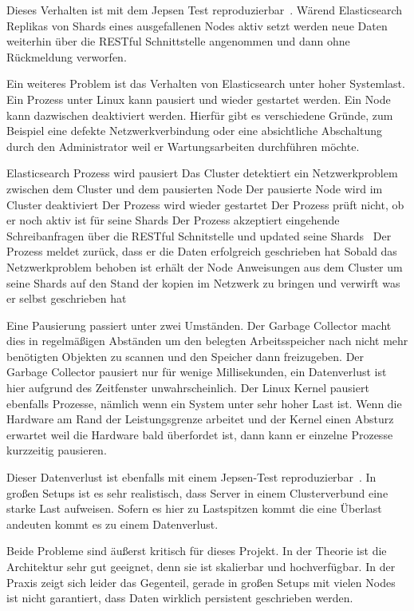 Dieses Verhalten ist mit dem Jepsen Test reproduzierbar~\cite{es_jepsen_iso}.
Wärend Elasticsearch Replikas von Shards eines ausgefallenen Nodes aktiv setzt
werden neue Daten weiterhin über die RESTful Schnittstelle angenommen und dann
ohne Rückmeldung verworfen.

Ein weiteres Problem ist das Verhalten von Elasticsearch unter hoher Systemlast.
Ein Prozess unter Linux kann pausiert und wieder gestartet werden. Ein Node
kann dazwischen deaktiviert werden. Hierfür gibt es verschiedene Gründe, zum
Beispiel eine defekte Netzwerkverbindung oder eine absichtliche Abschaltung
durch den Administrator weil er Wartungsarbeiten durchführen möchte.

\begin{outline}
  \1 Elasticsearch Prozess wird pausiert
  \1 Das Cluster detektiert ein Netzwerkproblem zwischen dem Cluster und dem
  pausierten Node
  \1 Der pausierte Node wird im Cluster deaktiviert
  \1 Der Prozess wird wieder gestartet
  \1 Der Prozess prüft nicht, ob er noch aktiv ist für seine Shards
  \1 Der Prozess akzeptiert eingehende Schreibanfragen über die RESTful
  Schnitstelle und updated seine Shards
  \ Der Prozess meldet zurück, dass er die Daten erfolgreich geschrieben hat
  \1 Sobald das Netzwerkproblem behoben ist erhält der Node Anweisungen aus dem
  Cluster um seine Shards auf den Stand der kopien im Netzwerk zu bringen und
  verwirft was er selbst geschrieben hat
\end{outline}

Eine Pausierung passiert unter zwei Umständen. Der \gls{Garbage Collector}
macht dies in regelmäßigen Abständen um den belegten Arbeitsspeicher nach nicht
mehr benötigten Objekten zu scannen und den Speicher dann freizugeben. Der
Garbage Collector pausiert nur für wenige Millisekunden, ein Datenverlust ist
hier aufgrund des Zeitfenster unwahrscheinlich. Der Linux Kernel pausiert
ebenfalls Prozesse, nämlich wenn ein System unter sehr hoher Last ist.  Wenn
die Hardware am Rand der Leistungsgrenze arbeitet und der Kernel einen Absturz
erwartet weil die Hardware bald überfordet ist, dann kann er einzelne Prozesse
kurzzeitig pausieren.

Dieser Datenverlust ist ebenfalls mit einem Jepsen-Test
reproduzierbar~\cite{es_jepsen_pause}. In großen Setups ist es sehr
realistisch, dass Server in einem Clusterverbund eine starke Last aufweisen.
Sofern es hier zu Lastspitzen kommt die eine Überlast andeuten kommt es zu
einem Datenverlust.

Beide Probleme sind äußerst kritisch für dieses Projekt. In der Theorie ist die
Architektur sehr gut geeignet, denn sie ist skalierbar und hochverfügbar. In
der Praxis zeigt sich leider das Gegenteil, gerade in großen Setups mit vielen
Nodes ist nicht garantiert, dass Daten wirklich persistent geschrieben werden.
\tm%

